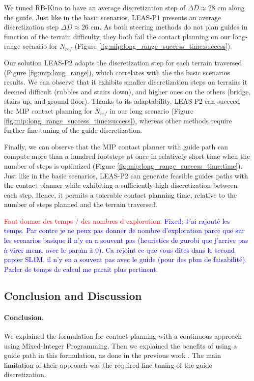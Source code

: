 We tuned RB-Kino to have an average discretization step of $\Delta \overline{D} \approx 28$ cm along the guide.
Just like in the basic scenarios, LEAS-P1 presents an average discretization step $\Delta \overline{D} \approx 26$ cm.
As both steering methods do not plan guides in function of the terrain difficulty, they both fail the contact planning on our long-range scenario for $N_{ref}$ (Figure \ref{fig:mip:long_range_success_time:success}).

Our solution LEAS-P2 adapts the discretization step for each terrain traversed (Figure \ref{fig:mip:long_range}), which correlates with the the basic scenarios results. 
We can observe that it exhibits smaller discretization steps on terrains it deemed difficult (rubbles and stairs down), and higher ones on the others (bridge, stairs up, and ground floor).
Thanks to its adaptability, LEAS-P2 can succeed the MIP contact planning for $N_{ref}$ in our long scenario (Figure \ref{fig:mip:long_range_success_time:success}), whereas other methods require further fine-tuning of the guide discretization.

Finally, we can observe that the MIP contact planner with guide path can compute more than a hundred footsteps at once in relatively short time when the number of steps is optimized (Figure \ref{fig:mip:long_range_success_time:time}).
Just like in the basic scenarios, LEAS-P2 can generate feasible guides paths with the contact planner while exhibiting a sufficiently high discretization between each step. Hence, it permits a tolerable contact planning time, relative to the number of steps planned and the terrain traversed.

\textcolor{red}{Faut donner des temps / des nombres d exploration. }
\textcolor{blue}{Fixed; J'ai rajouté les temps. Par contre je ne peux pas donner de nombre d'exploration parce que sur les scenarios basique il n'y en a souvent pas (heuristics de gurobi que j'arrive pas à virer meme avec le param à 0). Ca rejoint ce que vous dites dans le second papier SL1M, il n'y en a souvent pas avec le guide (pour des pbm de faisabilité). Parler de temps de calcul me parait plus pertinent.}


\subsection{Conclusion and Discussion}
\label{subsub:mip:discussion}
\paragraph{Conclusion.}
We explained the formulation for contact planning with a continuous approach using Mixed-Integer Programming.
Then we explained the benefits of using a guide path in this formulation, as done in the previous work \cite{sl1m_v2}.
The main limitation of their approach was the required fine-tuning of the guide discretization.

